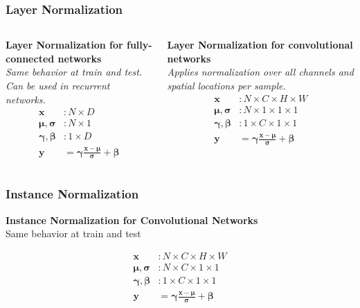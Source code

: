 \documentclass[default, aspectratio=169]{beamer}
\begin{document}
\begin{frame}
    \frametitle{Layer Normalization}
    \begin{columns}[T]
        \centering
        \textbf{Layer Normalization for fully-connected networks}\\
        \textit{Same behavior at train and test.}\\
        \textit{Can be used in recurrent networks.}
        \[
        \begin{aligned}
        \mathbf{x} &: N \times D \\
        \boldsymbol{\mu}, \boldsymbol{\sigma} &: N \times 1 \\
        \boldsymbol{\gamma}, \boldsymbol{\beta} &: 1 \times D \\
        \mathbf{y} &= \boldsymbol{\gamma} \frac{\mathbf{x} - \boldsymbol{\mu}}{\boldsymbol{\sigma}} + \boldsymbol{\beta}
        \end{aligned}
        \]
        
        \centering
        \textbf{Layer Normalization for convolutional networks}\\
        \textit{Applies normalization over all channels and spatial locations per sample.}\\
        \[
        \begin{aligned}
        \mathbf{x} &: N \times C \times H \times W \\
        \boldsymbol{\mu}, \boldsymbol{\sigma} &: N \times 1 \times 1 \times 1 \\
        \boldsymbol{\gamma}, \boldsymbol{\beta} &: 1 \times C \times 1 \times 1 \\
        \mathbf{y} &= \boldsymbol{\gamma} \frac{\mathbf{x} - \boldsymbol{\mu}}{\boldsymbol{\sigma}} + \boldsymbol{\beta}
        \end{aligned}
        \]
    \end{columns}
\end{frame}

    
\begin{frame}
    \frametitle{Instance Normalization}
    \begin{center}
        \textbf{Instance Normalization for Convolutional Networks} \\
        Same behavior at train and test
    \end{center}
    \vspace{0.3cm}
    \[
    \begin{aligned}
    \mathbf{x} &: N \times C \times H \times W \\
    \boldsymbol{\mu}, \boldsymbol{\sigma} &: N \times C \times 1 \times 1 \\
    \boldsymbol{\gamma}, \boldsymbol{\beta} &: 1 \times C \times 1 \times 1 \\
    \mathbf{y} &= \boldsymbol{\gamma} \frac{\mathbf{x} - \boldsymbol{\mu}}{\boldsymbol{\sigma}} + \boldsymbol{\beta}
    \end{aligned}
    \]
\end{frame}
\end{document}

